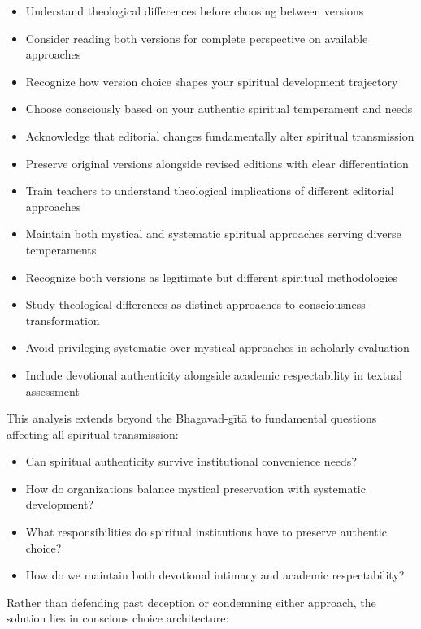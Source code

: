 \documentclass[12pt,twoside]{book}
\begin{document}
\begin{itemize}
\item Understand theological differences before choosing between versions
\item Consider reading both versions for complete perspective on available approaches
\item Recognize how version choice shapes your spiritual development trajectory
\item Choose consciously based on your authentic spiritual temperament and needs

\item Acknowledge that editorial changes fundamentally alter spiritual transmission
\item Preserve original versions alongside revised editions with clear differentiation
\item Train teachers to understand theological implications of different editorial approaches
\item Maintain both mystical and systematic spiritual approaches serving diverse temperaments

\item Recognize both versions as legitimate but different spiritual methodologies
\item Study theological differences as distinct approaches to consciousness transformation
\item Avoid privileging systematic over mystical approaches in scholarly evaluation
\item Include devotional authenticity alongside academic respectability in textual assessment
\end{itemize}

This analysis extends beyond the Bhagavad-gītā to fundamental questions affecting all spiritual transmission:

\begin{itemize}
\item Can spiritual authenticity survive institutional convenience needs?
\item How do organizations balance mystical preservation with systematic development?
\item What responsibilities do spiritual institutions have to preserve authentic choice?
\item How do we maintain both devotional intimacy and academic respectability?
\end{itemize}


Rather than defending past deception or condemning either approach, the solution lies in conscious choice architecture:
\end{document}
